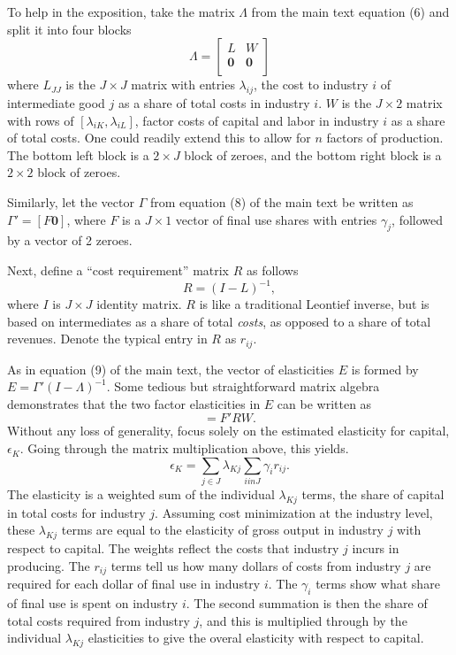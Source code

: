 To help in the exposition, take the matrix $\Lambda$ from the main text equation (6) and split it into four blocks
\begin{equation}
	\Lambda = 
	\begin{bmatrix}
		L & W \\
		\mathbf{0} & \mathbf{0} \\
	\end{bmatrix} \label{EQ_Lambda}
\end{equation} 
where $L_{JJ}$ is the $J \times J$ matrix with entries $\lambda_{ij}$, the cost to industry $i$ of intermediate good $j$ as a share of total costs in industry $i$. $W$ is the $J \times 2$ matrix with rows of $[\lambda_{iK}, \lambda_{iL}]$, factor costs of capital and labor in industry $i$ as a share of total costs. One could readily extend this to allow for $n$ factors of production. The bottom left block is a $2 \times J$ block of zeroes, and the bottom right block is a $2 \times 2$ block of zeroes.

Similarly, let the vector $\Gamma$ from equation (8) of the main text be written as $\Gamma' = [F \mathbf{0}]$, where $F$ is a $J \times 1$ vector of final use shares with entries $\gamma_j$, followed by a vector of 2 zeroes. 

Next, define a ``cost requirement'' matrix $R$ as follows
\begin{equation}
	R = (I - L)^{-1},
\end{equation}
where $I$ is $J \times J$ identity matrix. $R$ is like a traditional Leontief inverse, but is based on intermediates as a share of total \textit{costs}, as opposed to a share of total revenues. Denote the typical entry in $R$ as $r_{ij}$.

As in equation (9) of the main text, the vector of elasticities $E$ is formed by $E = \Gamma'(I-\Lambda)^{-1}$. Some tedious but straightforward matrix algebra demonstrates that the two factor elasticities in $E$ can be written as
\begin{equation}
	[\epsilon_K \text{ } \epsilon_L] = F'RW. 
\end{equation}
Without any loss of generality, focus solely on the estimated elasticity for capital, $\epsilon_K$. Going through the matrix multiplication above, this yields.
\begin{equation}
	\epsilon_K = \sum_{j \in J} \lambda_{Kj} \sum_{i in J} \gamma_i r_{ij}. \label{EQ_eK}
\end{equation}
The elasticity is a weighted sum of the individual $\lambda_{Kj}$ terms, the share of capital in total costs for industry $j$. Assuming cost minimization at the industry level, these $\lambda_{Kj}$ terms are equal to the elasticity of gross output in industry $j$ with respect to capital. The weights reflect the costs that industry $j$ incurs in producing. The $r_{ij}$ terms tell us how many dollars of costs from industry $j$ are required for each dollar of final use in industry $i$. The $\gamma_i$ terms show what share of final use is spent on industry $i$. The second summation is then the share of total costs required from industry $j$, and this is multiplied through by the individual $\lambda_{Kj}$ elasticities to give the overal elasticity with respect to capital. 

